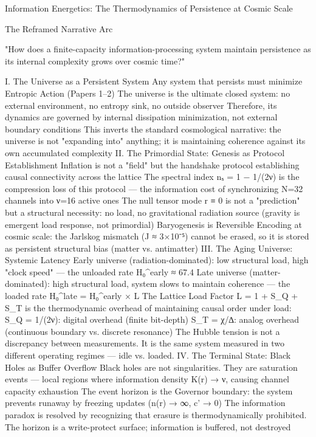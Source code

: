 Information Energetics: The Thermodynamics of Persistence at Cosmic Scale

The Reframed Narrative Arc

"How does a finite-capacity information-processing system maintain persistence as its internal complexity grows over cosmic time?"

I. The Universe as a Persistent System
Any system that persists must minimize Entropic Action (Papers 1–2)
The universe is the ultimate closed system: no external environment, no entropy sink, no outside observer
Therefore, its dynamics are governed by internal dissipation minimization, not external boundary conditions
This inverts the standard cosmological narrative: the universe is not "expanding into" anything; it is maintaining coherence against its own accumulated complexity
II. The Primordial State: Genesis as Protocol Establishment
Inflation is not a "field" but the handshake protocol establishing causal connectivity across the lattice
The spectral index nₛ = 1 − 1/(2ν) is the compression loss of this protocol — the information cost of synchronizing N=32 channels into ν=16 active ones
The null tensor mode r ≡ 0 is not a "prediction" but a structural necessity: no load, no gravitational radiation source (gravity is emergent load response, not primordial)
Baryogenesis is Reversible Encoding at cosmic scale: the Jarlskog mismatch (J ≈ 3×10⁻⁵) cannot be erased, so it is stored as persistent structural bias (matter vs. antimatter)
III. The Aging Universe: Systemic Latency
Early universe (radiation-dominated): low structural load, high "clock speed" — the unloaded rate H₀^early ≈ 67.4
Late universe (matter-dominated): high structural load, system slows to maintain coherence — the loaded rate H₀^late = H₀^early × L
The Lattice Load Factor L = 1 + S_Q + S_T is the thermodynamic overhead of maintaining causal order under load:
S_Q = 1/(2ν): digital overhead (finite bit-depth)
S_T = χ/∆: analog overhead (continuous boundary vs. discrete resonance)
The Hubble tension is not a discrepancy between measurements. It is the same system measured in two different operating regimes — idle vs. loaded.
IV. The Terminal State: Black Holes as Buffer Overflow
Black holes are not singularities. They are saturation events — local regions where information density K(r) → ν, causing channel capacity exhaustion
The event horizon is the Governor boundary: the system prevents runaway by freezing updates (n(r) → ∞, c' → 0)
The information paradox is resolved by recognizing that erasure is thermodynamically prohibited. The horizon is a write-protect surface; information is buffered, not destroyed
